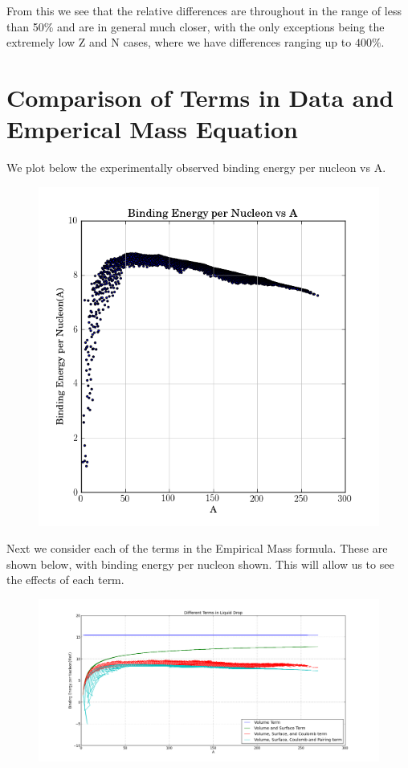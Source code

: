 \documentclass[11pt]{article} %
\begin{document}
From this we see that the relative differences are throughout in the range of less than 50\% and are in general much closer, with the only exceptions being the extremely low Z and N cases, where we have differences ranging up to $400\%$. \\
\newpage

\section{Comparison of Terms in Data and  Emperical Mass Equation}
We plot below the experimentally observed binding energy per nucleon vs A.

\vspace{1mm}
\begin{figure}[htbp]
\centering
\includegraphics[width=.7\linewidth]{"BindingEnergyVsA"}
\end{figure}
\vspace{1mm}


Next we consider each of the terms in the Empirical Mass formula. These are shown below, with binding energy per nucleon shown. 
This will allow us to see the effects of each term. 

\newpage
\vspace{1mm}
\begin{figure}[hbpt]
\centering
\includegraphics[width=.9\linewidth]{"LiquidDropTerms"}
\end{figure}
\vspace{1mm}
\end{document}
